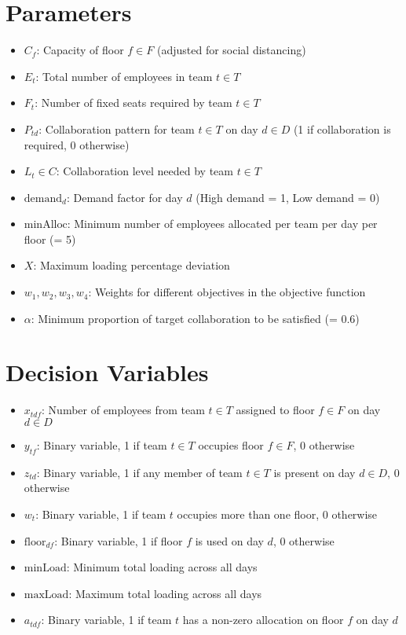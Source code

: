 \documentclass[12pt]{article}
\begin{document}
\section{Parameters}
\begin{itemize}
\item $C_f$: Capacity of floor $f \in F$ (adjusted for social distancing)
\item $E_t$: Total number of employees in team $t \in T$
\item $F_t$: Number of fixed seats required by team $t \in T$
\item $P_{td}$: Collaboration pattern for team $t \in T$ on day $d \in D$ (1 if collaboration is required, 0 otherwise)
\item $L_t \in C$: Collaboration level needed by team $t \in T$
\item $\text{demand}_d$: Demand factor for day $d$ (High demand = 1, Low demand = 0)
\item $\text{minAlloc}$: Minimum number of employees allocated per team per day per floor (= 5)
\item $X$: Maximum loading percentage deviation
\item $w_1, w_2, w_3, w_4$: Weights for different objectives in the objective function
\item $\alpha$: Minimum proportion of target collaboration to be satisfied (= 0.6)
\end{itemize}

\section{Decision Variables}
\begin{itemize}
\item $x_{tdf}$: Number of employees from team $t \in T$ assigned to floor $f \in F$ on day $d \in D$
\item $y_{tf}$: Binary variable, 1 if team $t \in T$ occupies floor $f \in F$, 0 otherwise
\item $z_{td}$: Binary variable, 1 if any member of team $t \in T$ is present on day $d \in D$, 0 otherwise
\item $w_t$: Binary variable, 1 if team $t$ occupies more than one floor, 0 otherwise
\item $\text{floor}_{df}$: Binary variable, 1 if floor $f$ is used on day $d$, 0 otherwise
\item $\text{minLoad}$: Minimum total loading across all days
\item $\text{maxLoad}$: Maximum total loading across all days
\item $a_{tdf}$: Binary variable, 1 if team $t$ has a non-zero allocation on floor $f$ on day $d$
\end{itemize}
\end{document}
